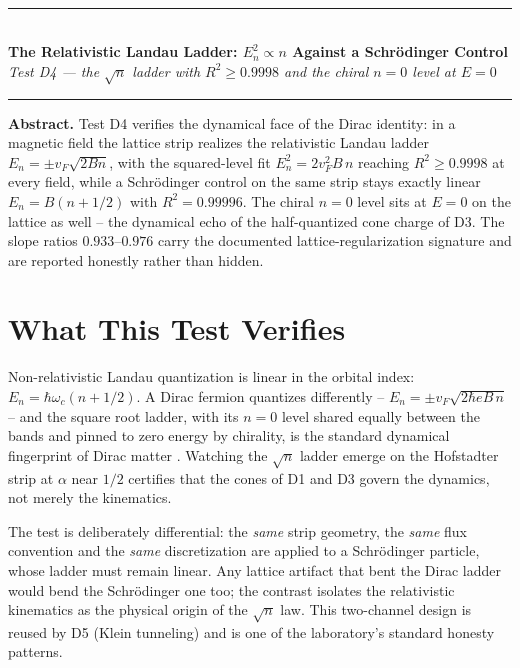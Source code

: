 \documentclass[11pt,a4paper]{article}
\begin{document}
\\[0.3em]
\rule{\textwidth}{0.8pt}\\[0.6em]
{\LARGE\bfseries\color{labblue} The Relativistic Landau Ladder: $E_n^2 \propto n$ Against a Schrödinger Control}\\[0.5em]
{\normalsize\itshape Test D4 — the $\sqrt{n}$ ladder with $R^2 \geq 0.9998$ and the chiral $n=0$ level at $E=0$}\\[0.4em]
\rule{\textwidth}{0.4pt}

\begin{tcolorbox}[colback=labgreen!8, colframe=labgreen!70!black, title={Verdict: PASS — 5/5 checks}, fonttitle=\bfseries, boxrule=0.6pt]
\textbf{Abstract.} Test D4 verifies the dynamical face of the Dirac identity: in a magnetic field the lattice strip realizes the relativistic Landau ladder $E_n = \pm v_F\sqrt{2Bn}$, with the squared-level fit $E_n^2 = 2 v_F^2 B\, n$ reaching $R^2 \geq 0.9998$ at every field, while a Schrödinger control on the same strip stays exactly linear $E_n = B(n+1/2)$ with $R^2 = 0.99996$. The chiral $n = 0$ level sits at $E = 0$ on the lattice as well -- the dynamical echo of the half-quantized cone charge of D3. The slope ratios $0.933$--$0.976$ carry the documented lattice-regularization signature and are reported honestly rather than hidden.
\end{tcolorbox}

\section{What This Test Verifies}
Non-relativistic Landau quantization is linear in the orbital index: $E_n = \hbar\omega_c (n+1/2)$. A Dirac fermion quantizes differently -- $E_n = \pm v_F\sqrt{2\hbar eB\, n}$ -- and the square root ladder, with its $n=0$ level shared equally between the bands and pinned to zero energy by chirality, is the standard dynamical fingerprint of Dirac matter \cite{dirac,mecklenburgshen}. Watching the $\sqrt{n}$ ladder emerge on the Hofstadter strip at $\alpha$ near $1/2$ certifies that the cones of D1 and D3 govern the dynamics, not merely the kinematics.

The test is deliberately differential: the \emph{same} strip geometry, the \emph{same} flux convention and the \emph{same} discretization are applied to a Schrödinger particle, whose ladder must remain linear. Any lattice artifact that bent the Dirac ladder would bend the Schrödinger one too; the contrast isolates the relativistic kinematics as the physical origin of the $\sqrt{n}$ law. This two-channel design is reused by D5 (Klein tunneling) and is one of the laboratory's standard honesty patterns.
\end{document}
